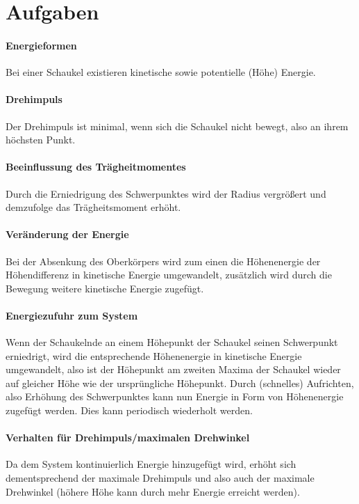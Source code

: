 \section{Aufgaben}
\paragraph{Energieformen}
Bei einer Schaukel existieren kinetische sowie potentielle (Höhe) Energie.
\paragraph{Drehimpuls}
Der Drehimpuls ist minimal, wenn sich die Schaukel nicht bewegt, also an ihrem höchsten Punkt.
\paragraph{Beeinflussung des Trägheitmomentes}
Durch die Erniedrigung des Schwerpunktes wird der Radius vergrößert und demzufolge das Trägheitsmoment erhöht.
\paragraph{Veränderung der Energie}
Bei der Absenkung des Oberkörpers wird zum einen die Höhenenergie der Höhendifferenz in kinetische Energie umgewandelt, zusätzlich wird durch die Bewegung weitere kinetische Energie zugefügt.
\paragraph{Energiezufuhr zum System}
Wenn der Schaukelnde an einem Höhepunkt der Schaukel seinen Schwerpunkt erniedrigt, wird die entsprechende Höhenenergie in kinetische Energie umgewandelt, also ist der Höhepunkt am zweiten Maxima der Schaukel wieder auf gleicher Höhe wie der ursprüngliche Höhepunkt. Durch (schnelles) Aufrichten, also Erhöhung des Schwerpunktes kann nun Energie in Form von Höhenenergie zugefügt werden. Dies kann periodisch wiederholt werden.
\paragraph{Verhalten für Drehimpuls/maximalen Drehwinkel} Da dem System kontinuierlich Energie hinzugefügt wird, erhöht sich dementsprechend der maximale Drehimpuls und also auch der maximale Drehwinkel (höhere Höhe kann durch mehr Energie erreicht werden).